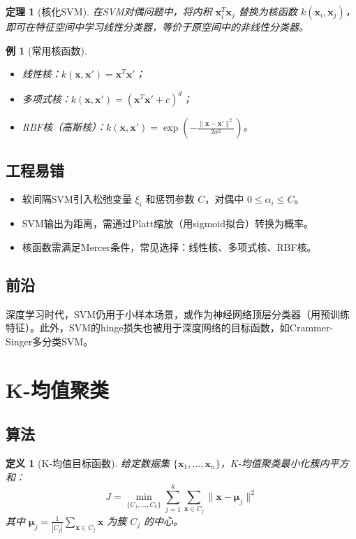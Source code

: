 \documentclass[UTF8, 10pt]{ctexart}
\newtheorem{theorem}{定理}[section]
\newtheorem{definition}{定义}[section]
\newtheorem{example}{例}[section]
\begin{document}
\begin{theorem}[核化SVM]
在SVM对偶问题中，将内积 $\bm{x}_i^T \bm{x}_j$ 替换为核函数 $k(\bm{x}_i, \bm{x}_j)$，即可在特征空间中学习线性分类器，等价于原空间中的非线性分类器。
\end{theorem}

\begin{example}[常用核函数]
\begin{itemize}
    \item 线性核：$k(\bm{x}, \bm{x}') = \bm{x}^T \bm{x}'$；
    \item 多项式核：$k(\bm{x}, \bm{x}') = (\bm{x}^T \bm{x}' + c)^d$；
    \item RBF核（高斯核）：$k(\bm{x}, \bm{x}') = \exp\left(-\frac{\|\bm{x} - \bm{x}'\|^2}{2\sigma^2}\right)$。
\end{itemize}
\end{example}

\subsection{工程易错}
\begin{itemize}
    \item 软间隔SVM引入松弛变量 $\xi_i$ 和惩罚参数 $C$，对偶中 $0 \le \alpha_i \le C$。
    \item SVM输出为距离，需通过Platt缩放（用sigmoid拟合）转换为概率。
    \item 核函数需满足Mercer条件，常见选择：线性核、多项式核、RBF核。
\end{itemize}

\subsection{前沿}
深度学习时代，SVM仍用于小样本场景，或作为神经网络顶层分类器（用预训练特征）。此外，SVM的hinge损失也被用于深度网络的目标函数，如Crammer-Singer多分类SVM。

\section{K-均值聚类}
\subsection{算法}
\begin{definition}[K-均值目标函数]
给定数据集 $\{\bm{x}_1, \ldots, \bm{x}_n\}$，K-均值聚类最小化簇内平方和：
\[
J = \min_{\{C_1, \ldots, C_k\}} \sum_{j=1}^k \sum_{\bm{x} \in C_j} \|\bm{x} - \bm{\mu}_j\|^2
\]
其中 $\bm{\mu}_j = \frac{1}{|C_j|}\sum_{\bm{x} \in C_j} \bm{x}$ 为簇 $C_j$ 的中心。
\end{definition}
\end{document}
